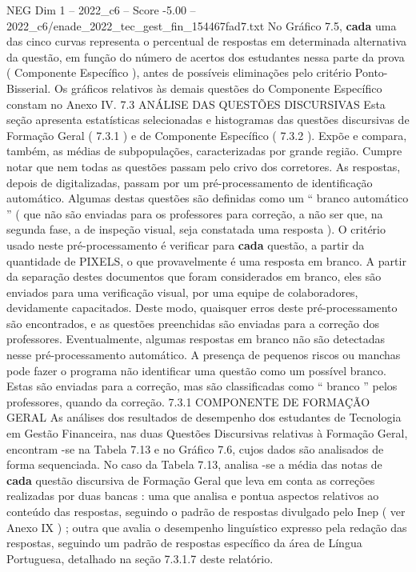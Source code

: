 \begin{textsample}{NEG Dim 1 – 2022\_c6 – Score -5.00 – 2022\_c6/enade\_2022\_tec\_gest\_fin\_154467fad7.txt}
No Gráfico 7.5, \textbf{cada} uma das cinco curvas representa o percentual de respostas em determinada alternativa da questão, em função do número de acertos dos estudantes nessa parte da prova ( Componente Específico ), antes de possíveis eliminações pelo critério Ponto-Bisserial.
Os gráficos relativos às demais questões do Componente Específico constam no Anexo IV. 7.3 ANÁLISE DAS QUESTÕES DISCURSIVAS Esta seção apresenta estatísticas selecionadas e histogramas das questões discursivas de Formação Geral ( 7.3.1 ) e de Componente Específico ( 7.3.2 ).
Expõe e compara, também, as médias de subpopulações, caracterizadas por grande região.
Cumpre notar que nem todas as questões passam pelo crivo dos corretores.
As respostas, depois de digitalizadas, passam por um pré-processamento de identificação automático.
Algumas destas questões são definidas como um “ branco automático ” ( que não são enviadas para os professores para correção, a não ser que, na segunda fase, a de inspeção visual, seja constatada uma resposta ).
O critério usado neste pré-processamento é verificar para \textbf{cada} questão, a partir da quantidade de PIXELS, o que provavelmente é uma resposta em branco.
A partir da separação destes documentos que foram considerados em branco, eles são enviados para uma verificação visual, por uma equipe de colaboradores, devidamente capacitados.
Deste modo, quaisquer erros deste pré-processamento são encontrados, e as questões preenchidas são enviadas para a correção dos professores.
Eventualmente, algumas respostas em branco não são detectadas nesse pré-processamento automático.
A presença de pequenos riscos ou manchas pode fazer o programa não identificar uma questão como um possível branco.
Estas são enviadas para a correção, mas são classificadas como “ branco ” pelos professores, quando da correção. 7.3.1 COMPONENTE DE FORMAÇÃO GERAL As análises dos resultados de desempenho dos estudantes de Tecnologia em Gestão Financeira, nas duas Questões Discursivas relativas à Formação Geral, encontram -se na Tabela 7.13 e no Gráfico 7.6, cujos dados são analisados de forma sequenciada.
No caso da Tabela 7.13, analisa -se a média das notas de \textbf{cada} questão discursiva de Formação Geral que leva em conta as correções realizadas por duas bancas : uma que analisa e pontua aspectos relativos ao conteúdo das respostas, seguindo o padrão de respostas divulgado pelo Inep ( ver Anexo IX ) ; outra que avalia o desempenho linguístico expresso pela redação das respostas, seguindo um padrão de respostas específico da área de Língua Portuguesa, detalhado na seção 7.3.1.7 deste relatório.

\end{textsample}
